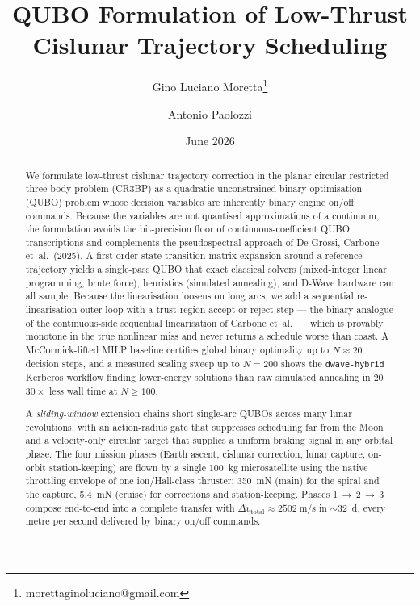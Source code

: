 \documentclass[11pt,a4paper]{article}
\title{\textbf{QUBO Formulation of Low-Thrust Cislunar Trajectory Scheduling}}
\author[1]{Gino Luciano Moretta\thanks{morettaginoluciano@gmail.com}}
\author[1]{Antonio Paolozzi}
\affil[1]{School of Aerospace Engineering, Sapienza Universit\`a di Roma}
\date{June 2026}
\theoremstyle{plain}
\begin{document}
\maketitle

\begin{abstract}
We formulate low-thrust cislunar trajectory correction in the planar circular restricted three-body problem (CR3BP) as a quadratic unconstrained binary optimisation (QUBO) problem whose decision variables are inherently binary engine on/off commands. Because the variables are not quantised approximations of a continuum, the formulation avoids the bit-precision floor of continuous-coefficient QUBO transcriptions and complements the pseudospectral approach of De Grossi, Carbone et~al.~(2025). A first-order state-transition-matrix expansion around a reference trajectory yields a single-pass QUBO that exact classical solvers (mixed-integer linear programming, brute force), heuristics (simulated annealing), and D-Wave hardware can all sample. Because the linearisation loosens on long arcs, we add a sequential re-linearisation outer loop with a trust-region accept-or-reject step --- the binary analogue of the continuous-side sequential linearisation of Carbone et~al.\ --- which is provably monotone in the true nonlinear miss and never returns a schedule worse than coast. A McCormick-lifted MILP baseline certifies global binary optimality up to $N \approx 20$ decision steps, and a measured scaling sweep up to $N = 200$ shows the \texttt{dwave-hybrid} Kerberos workflow finding lower-energy solutions than raw simulated annealing in $20$--$30\times$ less wall time at $N \ge 100$.

A \emph{sliding-window} extension chains short single-arc QUBOs across many lunar revolutions, with an action-radius gate that suppresses scheduling far from the Moon and a velocity-only circular target that supplies a uniform braking signal in any orbital phase. The four mission phases (Earth ascent, cislunar correction, lunar capture, on-orbit station-keeping) are flown by a single \SI{100}{\kg} microsatellite using the native throttling envelope of one ion/Hall-class thruster: \SI{350}{\milli\newton} (main) for the spiral and the capture, \SI{5.4}{\milli\newton} (cruise) for corrections and station-keeping. Phases 1\,$\to$\,2\,$\to$\,3 compose end-to-end into a complete transfer with $\Delta v_\mathrm{total} \approx \SI{2502}{\meter\per\second}$ in $\sim$\SI{32}{\day}, every metre per second delivered by binary on/off commands.
\end{abstract}
\end{document}
